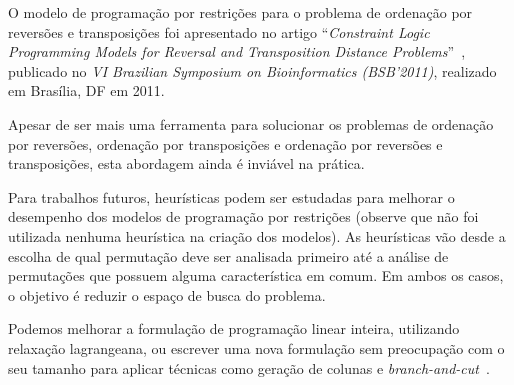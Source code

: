 O modelo de programação por restrições para o
problema de ordenação por reversões e transposições foi apresentado no
artigo ``\textit{Constraint Logic Programming Models for Reversal and
Transposition Distance Problems}''~\cite{IizukaDias*2011}, publicado no
\textit{VI Brazilian Symposium on Bioinformatics (BSB'2011)}, realizado
em Brasília, DF em 2011.

Apesar de ser mais uma ferramenta para solucionar os problemas de
ordenação por reversões, ordenação por transposições e ordenação por
reversões e transposições, esta abordagem ainda é inviável na prática.

Para trabalhos futuros, heurísticas podem ser estudadas para melhorar o
desempenho dos modelos de programação por restrições (observe que não
foi utilizada nenhuma heurística na criação dos modelos). As heurísticas
vão desde a escolha de qual permutação deve ser analisada primeiro até a
análise de permutações que possuem alguma característica em comum. Em
ambos os casos, o objetivo é reduzir o espaço de busca do problema.

Podemos melhorar a formulação de programação linear inteira, utilizando
relaxação lagrangeana, ou escrever uma nova formulação sem preocupação
com o seu tamanho para aplicar técnicas como geração de colunas e
\textit{branch-and-cut}~\cite{NemhauserWolsey*1988,Wolsey*1998}.
